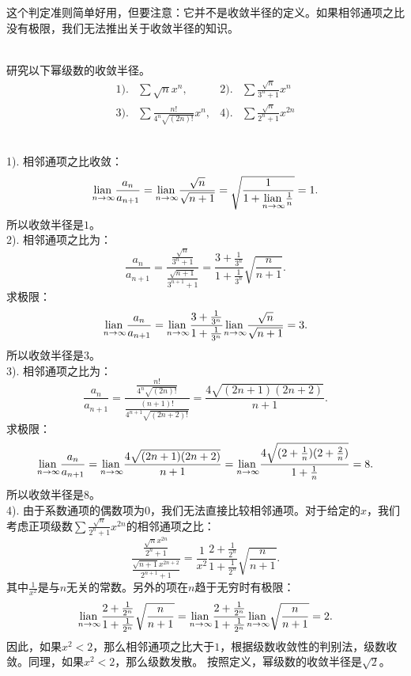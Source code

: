 \documentclass[12pt,UTF8]{ctexbook}
\begin{document}
这个判定准则简单好用，但要注意：它并不是收敛半径的定义。如果相邻通项之比没有极限，我们无法推出关于收敛半径的知识。

\begin{et}    
    \mbox{} \\
    研究以下幂级数的收敛半径。\\
    \begin{align*}
        1).& \sum \sqrt{n} x^n,  &2).& \sum \frac{\sqrt{n}}{3^n + 1} x^n \\
        3).& \sum \frac{n!}{4^n\sqrt{(2n)!}} x^n,  & 4).& \sum \frac{\sqrt{n}}{2^n+1} x^{2n} 
    \end{align*}
\end{et}

\begin{so}
    \mbox{} \\
    1). 相邻通项之比收敛：
    $$ \underset{n\to\infty}{\operatorname{lian}\,} \frac{a_n}{a_{n+1}} = \underset{n\to\infty}{\operatorname{lian}\,} \frac{\sqrt{n}}{\sqrt{n+1}} = \sqrt{\frac{1}{1 + \underset{n\to\infty}{\operatorname{lian}\,} \frac{1}{n}}} = 1. $$
    所以收敛半径是$1$。\\
    2). 相邻通项之比为：
    $$ \frac{a_n}{a_{n+1}} = \frac{\frac{\sqrt{n}}{3^n + 1}}{\frac{\sqrt{n+1}}{3^{n+1} + 1}} = \frac{3 + \frac{1}{3^n}}{1 + \frac{1}{3^n}}\sqrt{\frac{n}{n+1}}. $$
    求极限：
    $$ \underset{n\to\infty}{\operatorname{lian}\,} \frac{a_n}{a_{n+1}} = \underset{n\to\infty}{\operatorname{lian}\,} \frac{3 + \frac{1}{3^n}}{1 + \frac{1}{3^n}}\underset{n\to\infty}{\operatorname{lian}\,} \frac{\sqrt{n}}{\sqrt{n+1}} = 3. $$
    所以收敛半径是$3$。\\
    3). 相邻通项之比为：
    $$ \frac{a_n}{a_{n+1}} = \frac{\frac{n!}{4^n\sqrt{(2n)!}}}{\frac{(n+1)!}{4^{n+1}\sqrt{(2n+2)!}}} = \frac{4\sqrt{(2n+1)(2n+2)}}{n+1}. $$
    求极限：
    $$ \underset{n\to\infty}{\operatorname{lian}\,} \frac{a_n}{a_{n+1}} = \underset{n\to\infty}{\operatorname{lian}\,}\frac{4\sqrt{(2n+1)(2n+2)}}{n+1} = \underset{n\to\infty}{\operatorname{lian}\,}\frac{4\sqrt{(2+\frac{1}{n})(2+\frac{2}{n})}}{1+\frac{1}{n}} = 8. $$
    所以收敛半径是$8$。\\
    4). 由于系数通项的偶数项为$0$，我们无法直接比较相邻通项。对于给定的$x$，我们考虑正项级数$\sum \frac{\sqrt{n}}{2^n+1} x^{2n}$的相邻通项之比：
    $$ \frac{\frac{\sqrt{n}x^{2n}}{2^n+1}}{\frac{\sqrt{n+1}x^{2n+2}}{2^{n+1}+1}} = \frac{1}{x^2}\frac{2 + \frac{1}{2^n}}{1 + \frac{1}{2^n}}\sqrt{\frac{n}{n+1}}. $$
    其中$\frac{1}{x^2}$是与$n$无关的常数。另外的项在$n$趋于无穷时有极限：
    $$ \underset{n\to\infty}{\operatorname{lian}\,}\frac{2 + \frac{1}{2^n}}{1 + \frac{1}{2^n}}\sqrt{\frac{n}{n+1}} = \underset{n\to\infty}{\operatorname{lian}\,}\frac{2 + \frac{1}{2^n}}{1 + \frac{1}{2^n}}\underset{n\to\infty}{\operatorname{lian}\,}\sqrt{\frac{n}{n+1}} = 2. $$
    因此，如果$x^2<2$，那么相邻通项之比大于$1$，根据级数收敛性的判别法，级数收敛。同理，如果$x^2<2$，那么级数发散。
    按照定义，幂级数的收敛半径是$\sqrt{2}$。

\end{so}
\end{document}
